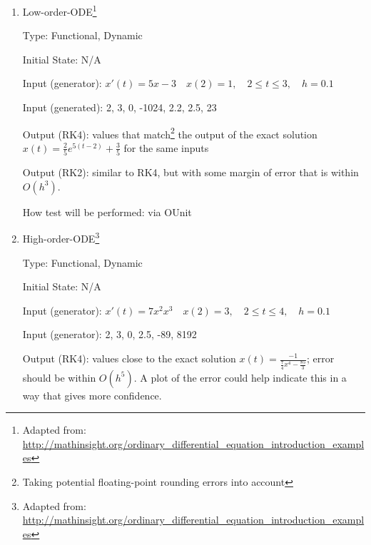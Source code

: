 \documentclass[12pt, titlepage]{article}
\begin{document}
\begin{enumerate}

\item{Low-order-ODE\footnote{Adapted from:
\url{http://mathinsight.org/ordinary_differential_equation_introduction_examples}}\\}

Type: Functional, Dynamic
					
Initial State: N/A
					
Input (generator): $x'(t) = 5x - 3 \quad x(2) = 1, \quad 2 \leq t \leq 3, \quad 
h = 0.1$

Input (generated): 2, 3, 0, -1024, 2.2, 2.5, 23 
					
Output (RK4): values that match\footnote{Taking potential floating-point 
rounding 
errors into account} the output of the exact solution $x(t) = \frac{2}{5} 
e^{5(t-2)} + \frac{3}{5}$ for the same inputs

Output (RK2): similar to RK4, but with some margin of error that is within 
$O(h^3)$.
					
How test will be performed: via OUnit

					
\item{High-order-ODE\footnote{Adapted from:
\url{http://mathinsight.org/ordinary_differential_equation_introduction_examples}}\\}

Type: Functional, Dynamic

Initial State: N/A

Input (generator): $x'(t) = 7x^2x^3 \quad x(2) = 3, \quad 2 \leq t \leq 4, 
\quad h = 0.1$ 

Input (generator): 2, 3, 0, 2.5, -89, 8192

Output (RK4): values close to the exact solution $x(t) = 
\frac{-1}{\frac{7}{4}x^4 - 
\frac{85}{3}}$; error should be within $O(h^5)$. A plot of the error could help 
indicate this in a way that gives more confidence.


\end{enumerate}
\end{document}
